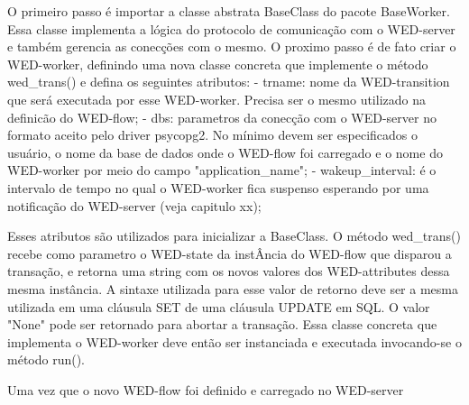  O primeiro passo é importar a classe abstrata BaseClass do pacote BaseWorker. Essa classe implementa a lógica do protocolo
de comunicação com o WED-server e também gerencia as conecções com o mesmo. 
  O proximo passo é de fato criar o WED-worker, definindo uma nova classe concreta que implemente o método wed_trans() e
defina os seguintes atributos:
  - trname: nome da WED-transition que será executada por esse WED-worker. Precisa ser o mesmo utilizado na definicão
           do WED-flow;
  - dbs: parametros da conecção com o WED-server no formato aceito pelo driver psycopg2. No mínimo devem ser especificados
        o usuário, o nome da base de dados onde o WED-flow foi carregado e o nome do WED-worker por meio do campo "application_name";
  - wakeup_interval: é o intervalo de tempo no qual o WED-worker fica suspenso esperando por uma notificação do WED-server (veja capitulo xx);
  
  Esses atributos são utilizados para inicializar a BaseClass.
  O método wed_trans() recebe como parametro o WED-state da instÂncia do WED-flow que disparou a transação, e retorna uma 
string com os novos valores dos WED-attributes dessa mesma instância. A sintaxe utilizada para esse valor de retorno deve
ser a mesma utilizada em uma cláusula SET de uma cláusula UPDATE em SQL. O valor "None" pode ser retornado para abortar
a transação.
  Essa classe concreta que implementa o WED-worker deve então ser instanciada e executada invocando-se o método run().


  Uma vez que o novo WED-flow foi definido e carregado no WED-server

 





  

 
    

